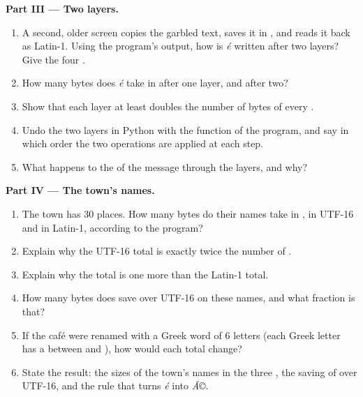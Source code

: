 \begin{problem}
\medskip\noindent\textbf{Part III --- Two layers.}
\begin{enumerate}[resume]
  \item A second, older screen copies the garbled text, saves it in , and reads it back as Latin-1. Using the
    program's output, how is \textit{é} written after two layers? Give the four .
  \item How many bytes does \textit{é} take in  after one layer, and after two?
  \item Show that each layer at least doubles the number of bytes of every  .
  \item Undo the two layers in Python with the function  of the program, and say in which order the
    two operations are applied at each step.
  \item What happens to the   of the message through the layers, and why?
\end{enumerate}

\medskip\noindent\textbf{Part IV --- The town's names.}
\begin{enumerate}[resume]
  \item The town has $30$ places. How many bytes do their names take in , in UTF-16 and in Latin-1, according
    to the program?
  \item Explain why the UTF-16 total is exactly twice the number of .
  \item Explain why the  total is one more than the Latin-1 total.
  \item How many bytes does  save over UTF-16 on these names, and what fraction is that?
  \item If the café were renamed with a Greek word of $6$ letters (each Greek letter has a  between
     and ), how would each total change?
  \item State the result: the sizes of the town's names in the three , the saving of  over UTF-16, and
    the rule that turns \textit{é} into \textit{Ã©}.
\end{enumerate}
\end{problem}
